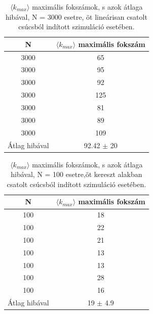 \documentclass[a4paper, 12pt]{article}
\numberwithin{equation}{section}          %
\numberwithin{figure}{subsection}
\begin{document}
\begin{table}[ht!]
	\captionsetup{justification=centering}
	\begin{center}
		\begin{tabular}{||c|c||}
			\hline
			N & $\langle k_{max} \rangle$ maximális fokszám \\  \hline
			3000 & 65 \\	\hline
			3000 &95 \\	\hline
			3000 & 92\\	\hline
			3000 & 125\\	\hline
			3000 & 81\\	\hline
			3000 & 89\\	\hline
			3000 & 109 \\	\hline
			Átlag hibával & 92.42 $\pm$ 20\\  \hline
		\end{tabular}
		\caption{$\langle k_{max} \rangle$ maximális fokszámok, s azok átlaga hibával, N = 3000 esetre, öt lineárisan csatolt
			csúcsból indított szimuláció esetében.}
	\end{center}
\end{table}





\begin{table}[ht!]
	\captionsetup{justification=centering}
	\begin{center}
		\begin{tabular}{||c|c||}
			\hline
			N & $\langle k_{max} \rangle$ maximális fokszám \\  \hline
			100 & 18 \\	\hline
			100 &22  \\	\hline
			100 & 21\\	\hline
			100 & 13\\	\hline
			100 & 13\\	\hline
			100 & 28\\	\hline
			100 & 16 \\	\hline
			Átlag hibával & 19 $\pm$ 4.9\\  \hline
		\end{tabular}
		\caption{$\langle k_{max} \rangle$ maximális fokszámok, s azok átlaga hibával, N = 100 esetre,öt kereszt alakban
			csatolt csúcsból indított szimuláció esetében.}
	\end{center}
\end{table}
\end{document}
